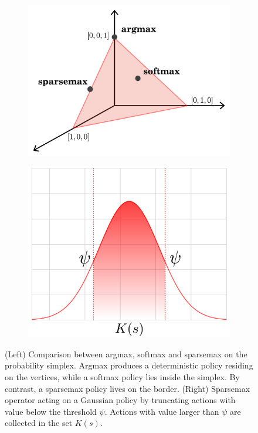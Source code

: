 \documentclass{article}
\begin{document}
\begin{figure}
    \centering
    \begin{subfigure}[b]{0.45\textwidth}
        \includegraphics[width=\textwidth]{img/2-simplex.png}
    \end{subfigure}
    \begin{subfigure}[b]{0.4\textwidth}
        \includegraphics[width=\textwidth]{img/Gaussian_ks.png}
    \end{subfigure}
    \caption{
        (Left) Comparison between argmax, softmax and sparsemax on the probability simplex. Argmax produces a deterministic policy residing on the vertices, while a softmax policy lies inside the simplex. By contrast, a sparsemax policy lives on the border.
        (Right) Sparsemax operator acting on a Gaussian policy by truncating actions with value below the threshold $\psi$.
        Actions with value larger than $\psi$ are collected in the set $K(s)$.
    }
    \label{fig:simplex_truncate}
\end{figure}
\end{document}
